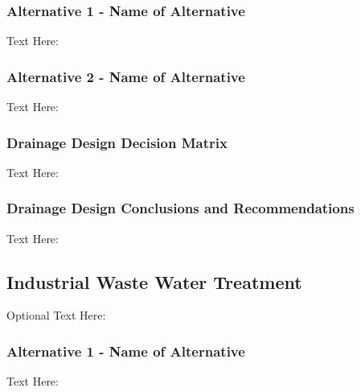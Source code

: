 \documentclass{ceri}
\begin{document}
\subsubsection{Alternative 1 - Name of Alternative}
Text Here:

\subsubsection{Alternative 2 - Name of Alternative}
Text Here:

\subsubsection{Drainage Design Decision Matrix}
Text Here:

\begin{table}[H]
\centering
\caption{Drainage Design Decision Matrix}
\label{my-label}
\end{table}

\subsubsection{Drainage Design Conclusions and Recommendations}
Text Here:
\newpage
\subsection{Industrial Waste Water Treatment}
Optional Text Here:

\subsubsection{Alternative 1 - Name of Alternative}
Text Here:
\end{document}
